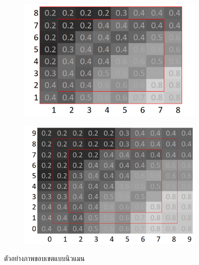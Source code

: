\begin{figure}[H]
    \centering
    \begin{subfigure}{0.4\linewidth}
        \centering
        \includegraphics[width=0.8\linewidth]{image/boundary_condition/show_bounary.png}
    \end{subfigure}
    \begin{subfigure}{0.4\linewidth}
        \centering
        \includegraphics[width=0.8\linewidth]{image/boundary_condition/extend_edge_neuman.png}
    \end{subfigure}
    \label{figure:boundary_condition}
    \caption{ตัวอย่างภาพขอบเขตแบบนิวแมน}
\end{figure}